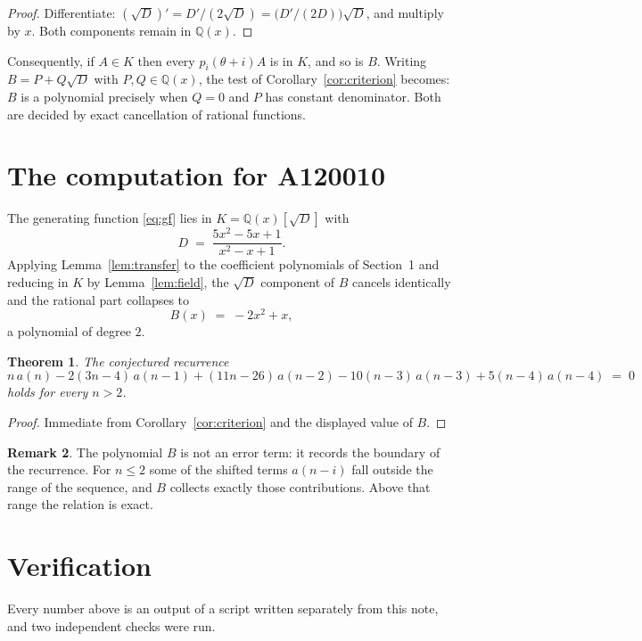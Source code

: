 \documentclass[11pt,a4paper]{article}
\theoremstyle{plain}
\newtheorem{theorem}{Theorem}
\theoremstyle{definition}
\newtheorem{remark}[theorem]{Remark}
\begin{document}
\begin{proof}
Differentiate: $(\sqrt{D})'=D'/(2\sqrt{D})=\bigl(D'/(2D)\bigr)\sqrt{D}$, and multiply by
$x$. Both components remain in $\mathbb{Q}(x)$.
\end{proof}

Consequently, if $A\in K$ then every $p_{i}(\theta+i)A$ is in $K$, and so is $B$. Writing
$B=P+Q\sqrt{D}$ with $P,Q\in\mathbb{Q}(x)$, the test of Corollary~\ref{cor:criterion}
becomes: $B$ is a polynomial precisely when $Q=0$ and $P$ has constant denominator. Both
are decided by exact cancellation of rational functions.

\section{The computation for A120010}

The generating function \eqref{eq:gf} lies in $K=\mathbb{Q}(x)[\sqrt{D}]$ with
\[
D \;=\; \frac{5 x^{2} - 5 x + 1}{x^{2} - x + 1} .
\]
Applying Lemma~\ref{lem:transfer} to the coefficient polynomials of Section~1 and reducing
in $K$ by Lemma~\ref{lem:field}, the $\sqrt{D}$ component of $B$ cancels identically and
the rational part collapses to
\[
B(x)\;=\;- 2 x^{2} + x ,
\]
a polynomial of degree $2$.

\begin{theorem}
The conjectured recurrence
\[
n\,a(n) -  2 \left(3 n - 4\right)\,a(n-1) + (11 n - 26)\,a(n-2) -  10 \left(n - 3\right)\,a(n-3) + 5 \left(n - 4\right)\,a(n-4) \;=\;0
\]
holds for every $n>2$.
\end{theorem}

\begin{proof}
Immediate from Corollary~\ref{cor:criterion} and the displayed value of $B$.
\end{proof}

\begin{remark}
The polynomial $B$ is not an error term: it records the boundary of the recurrence. For
$n\le2$ some of the shifted terms $a(n-i)$ fall outside the range of the sequence,
and $B$ collects exactly those contributions. Above that range the relation is exact.
\end{remark}

\section{Verification}

Every number above is an output of a script written separately from this note, and two
independent checks were run.
\end{document}
